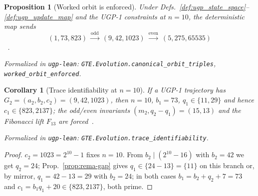 \documentclass[12pt]{article}
\newtheorem{corollary}[theorem]{Corollary}
\newtheorem{proposition}[theorem]{Proposition}
\numberwithin{equation}{section}
\begin{document}
\begin{proposition}[Worked orbit is enforced]\label{prop:worked-orbit}
Under Defs.~\ref{def:ugp_state_space}--\ref{def:ugp_update_map} and the UGP-1 constraints at $n=10$, the deterministic map sends
\[
(1,73,823)\ \xrightarrow{\text{odd}}\ (9,42,1023)\ \xrightarrow{\text{even}}\ (5,275,65535)
\]
~\cite{SpivackUGPFormalization,ugp-lean}.

\noindent\emph{Formalized in} \texttt{ugp-lean}: \texttt{GTE.Evolution.canonical\_orbit\_triples}, \texttt{worked\_orbit\_enforced}.
\end{proposition}

\begin{corollary}[Trace identifiability at $n=10$]
If a UGP-1 trajectory has $G_2=(a_2,b_2,c_2)=(9,42,1023)$, then $n=10$, $b_1=73$, $q_1\in\{11,29\}$ and hence $c_1\in\{823,2137\}$; the odd/even invariants $(m_2,q_2-q_1)=(15,13)$ and the Fibonacci lift $F_{13}$ are forced~\cite{SpivackUGPFormalization,ugp-lean}.

\noindent\emph{Formalized in} \texttt{ugp-lean}: \texttt{GTE.Evolution.trace\_identifiability}.
\end{corollary}
\begin{proof}
$c_2=1023=2^{10}-1$ fixes $n=10$. From $b_2\mid(2^{10}-16)$ with $b_2=42$ we get $q_2=24$; Prop.~\ref{prop:rema-gap} gives $q_1\in\{24-13\}= \{11\}$ on this branch or, by mirror, $q_1=42-13=29$ with $b_2=24$; in both cases $b_1=b_2+q_2+7=73$ and $c_1=b_1 q_1+20\in\{823,2137\}$, both prime.
\end{proof}
\end{document}
